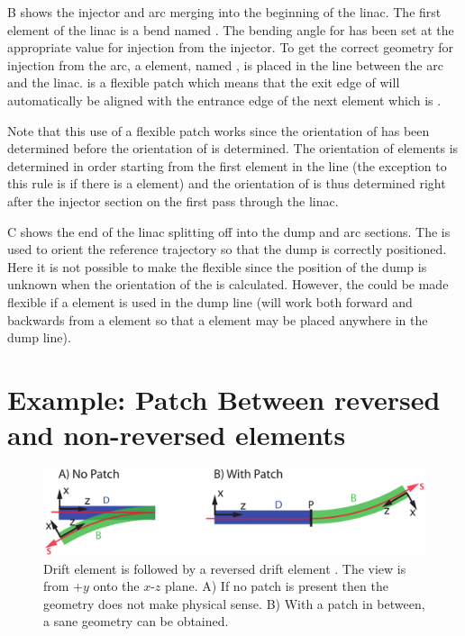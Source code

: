B shows the injector and arc merging into the beginning of the linac. The first element
of the linac is a bend named . The bending angle for  has been set at the
appropriate value for injection from the injector. To get the correct geometry for injection from
the arc, a  element, named , is placed in the  line between the arc
and the linac.  is a flexible patch which means that the exit edge of  will
automatically be aligned with the entrance edge of the next element which is .

Note that this use of a flexible patch works since the orientation of  has been
determined before the orientation of  is determined. The orientation of elements is
determined in order starting from the first element in the line (the exception to this rule is if
there is a  element) and the orientation of  is thus determined right
after the injector section on the first pass through the linac.

C shows the end of the linac splitting off into the dump and arc sections. The
 is used to orient the reference trajectory so that the dump is correctly positioned.
Here it is not possible to make the  flexible since the position of the dump is unknown
when the orientation of the  is calculated. However, the  could be made
flexible if a  element is used in the dump line (\bmad will work both forward and
backwards from a  element so that a  element may be placed
anywhere in the dump line).

\section{Example: Patch Between reversed and non-reversed elements}
\label{s:ex.patch}

\begin{figure}[tb]
  \centering
  \includegraphics[width=5in]{patch-between.pdf}
  \caption[Patching between reversed and non-reversed elements.]{
Drift element  is followed by a reversed drift element .  The view is from $+y$ onto the
$x$-$z$ plane. A) If no patch is present then the geometry does not make physical sense. B) With a
patch in between, a sane geometry can be obtained.}
  \label{f:patch.between}
\end{figure}

